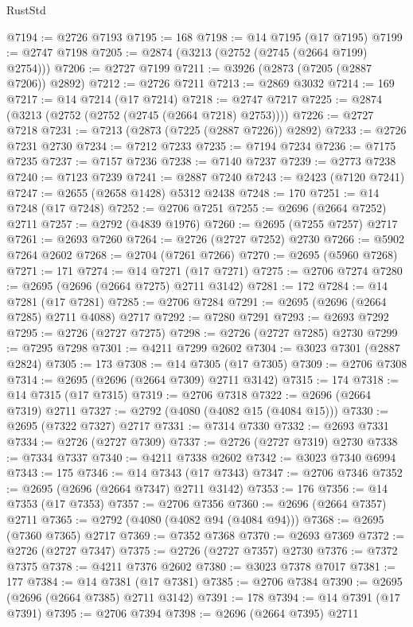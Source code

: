 \begin{lexlean}{RustStd}
\begin{coremodule}
@7194 := @2726 @7193
@7195 := 168
@7198 := @14 @7195 (@17 @7195)
@7199 := @2747 @7198
@7205 := @2874 (@3213 (@2752 (@2745 (@2664 @7199) @2754)))
@7206 := @2727 @7199
@7211 := @3926 (@2873 (@7205 (@2887 @7206)) @2892)
@7212 := @2726 @7211
@7213 := @2869 @3032
@7214 := 169
@7217 := @14 @7214 (@17 @7214)
@7218 := @2747 @7217
@7225 := @2874 (@3213 (@2752 (@2752 (@2745 (@2664 @7218) @2753))))
@7226 := @2727 @7218
@7231 := @7213 (@2873 (@7225 (@2887 @7226)) @2892)
@7233 := @2726 @7231 @2730
@7234 := @7212 @7233
@7235 := @7194 @7234
@7236 := @7175 @7235
@7237 := @7157 @7236
@7238 := @7140 @7237
@7239 := @2773 @7238
@7240 := @7123 @7239
@7241 := @2887 @7240
@7243 := @2423 (@7120 @7241)
@7247 := @2655 (@2658 @1428) @5312 @2438
@7248 := 170
@7251 := @14 @7248 (@17 @7248)
@7252 := @2706 @7251
@7255 := @2696 (@2664 @7252) @2711
@7257 := @2792 (@4839 @1976)
@7260 := @2695 (@7255 @7257) @2717
@7261 := @2693 @7260
@7264 := @2726 (@2727 @7252) @2730
@7266 := @5902 @7264 @2602
@7268 := @2704 (@7261 @7266)
@7270 := @2695 (@5960 @7268)
@7271 := 171
@7274 := @14 @7271 (@17 @7271)
@7275 := @2706 @7274
@7280 := @2695 (@2696 (@2664 @7275) @2711 @3142)
@7281 := 172
@7284 := @14 @7281 (@17 @7281)
@7285 := @2706 @7284
@7291 := @2695 (@2696 (@2664 @7285) @2711 @4088) @2717
@7292 := @7280 @7291
@7293 := @2693 @7292
@7295 := @2726 (@2727 @7275)
@7298 := @2726 (@2727 @7285) @2730
@7299 := @7295 @7298
@7301 := @4211 @7299 @2602
@7304 := @3023 @7301 (@2887 @2824)
@7305 := 173
@7308 := @14 @7305 (@17 @7305)
@7309 := @2706 @7308
@7314 := @2695 (@2696 (@2664 @7309) @2711 @3142)
@7315 := 174
@7318 := @14 @7315 (@17 @7315)
@7319 := @2706 @7318
@7322 := @2696 (@2664 @7319) @2711
@7327 := @2792 (@4080 (@4082 @15 (@4084 @15)))
@7330 := @2695 (@7322 @7327) @2717
@7331 := @7314 @7330
@7332 := @2693 @7331
@7334 := @2726 (@2727 @7309)
@7337 := @2726 (@2727 @7319) @2730
@7338 := @7334 @7337
@7340 := @4211 @7338 @2602
@7342 := @3023 @7340 @6994
@7343 := 175
@7346 := @14 @7343 (@17 @7343)
@7347 := @2706 @7346
@7352 := @2695 (@2696 (@2664 @7347) @2711 @3142)
@7353 := 176
@7356 := @14 @7353 (@17 @7353)
@7357 := @2706 @7356
@7360 := @2696 (@2664 @7357) @2711
@7365 := @2792 (@4080 (@4082 @94 (@4084 @94)))
@7368 := @2695 (@7360 @7365) @2717
@7369 := @7352 @7368
@7370 := @2693 @7369
@7372 := @2726 (@2727 @7347)
@7375 := @2726 (@2727 @7357) @2730
@7376 := @7372 @7375
@7378 := @4211 @7376 @2602
@7380 := @3023 @7378 @7017
@7381 := 177
@7384 := @14 @7381 (@17 @7381)
@7385 := @2706 @7384
@7390 := @2695 (@2696 (@2664 @7385) @2711 @3142)
@7391 := 178
@7394 := @14 @7391 (@17 @7391)
@7395 := @2706 @7394
@7398 := @2696 (@2664 @7395) @2711

\end{coremodule}
\end{lexlean}
